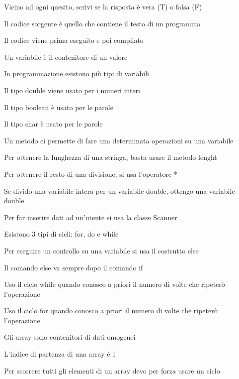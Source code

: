 \documentclass[addpoints]{exam}
\newcommand{\tf}[1][{}]{%
	\fillin[#1][0.25in]%
}
\begin{document}
 
\begin{center}
\end{center} 
 
\vspace{5mm}
 
 
\vspace{5mm}
 
Vicino ad ogni quesito, scrivi se la risposta è vera (T) o falsa (F)
\begin{multicols}{2}
\begin{questions}

\question \tf[T] Il codice sorgente è quello che contiene il testo di un programma

\question \tf[F] Il codice viene prima eseguito e poi compilato

\question \tf[T] Un variabile è il contenitore di un valore

\question \tf[T] In programmazione esistono più tipi di variabili

\question \tf[F] Il tipo double viene usato per i numeri interi

\question \tf[F] Il tipo boolean è usato per le parole

\question \tf[T] Il tipo char è usato per le parole

\question \tf[T] Un metodo ci permette di fare una determinata operazioni su una variabile

\question \tf[T] Per ottenere la lunghezza di una stringa, basta usare il metodo lenght

\question \tf[F] Per ottenere il resto di una divisione, si usa l'operatore *

\question \tf[F] Se divido una variabile intera per un variabile double, ottengo una variabile double

\question \tf[T] Per far inserire dati ad un'utente si usa la classe Scanner

\question \tf[T] Esistono 3 tipi di cicli: for, do e while

\question \tf[F] Per eseguire un controllo su una variabile si usa il costrutto else

\question \tf[T] Il comando else va sempre dopo il comando if

\question \tf[F] Uso il ciclo while quando conosco a priori il numero di volte che ripeterò l'operazione

\question \tf[T] Uso il ciclo for quando conosco a priori il numero di volte che ripeterò l'operazione 

\question \tf[T] Gli array sono contenitori di dati omogenei

\question \tf[F] L'indice di partenza di una array è 1

\question \tf[T] Per scorrere tutti gli elementi di un array devo per forza usare un ciclo


\end{questions}
\end{multicols}
\end{document}
